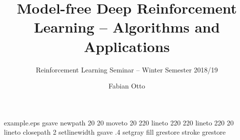%
%
%
%
%
\begin{filecontents*}{example.eps}
    gsave
    newpath
    20 20 moveto
    20 220 lineto
    220 220 lineto
    220 20 lineto
    closepath
    2 setlinewidth
    gsave
    .4 setgray fill
    grestore
    stroke
    grestore
\end{filecontents*}
%
\RequirePackage{fix-cm}
%
\documentclass{svjour3}                     %
%
\smartqed  %
%
\usepackage{graphicx}
\usepackage{amssymb}
\usepackage{amsmath}
\usepackage[final]{pdfpages}
\usepackage[english]{babel}

%
%
%
%
%

\DeclareMathOperator*{\argmax}{arg\,max} 



    \title{Model-free Deep Reinforcement Learning -- Algorithms and Applications}
    \subtitle{Reinforcement Learning Seminar -- Winter Semester 2018/19}

    \author{Fabian Otto}


